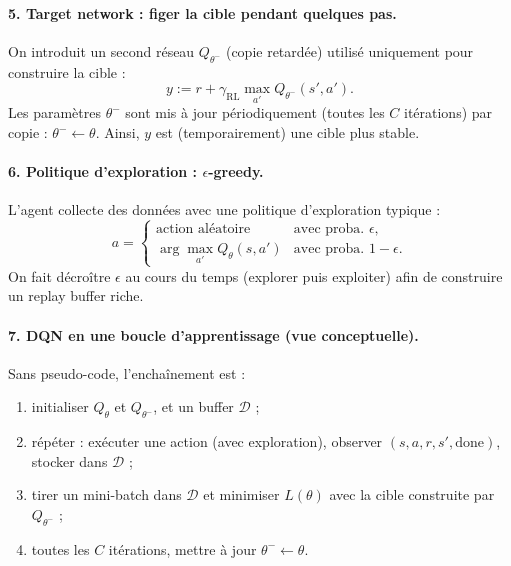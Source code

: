 \documentclass[11pt,a4paper]{article}
\newcommand{\1}{\mathbf{1}}
\begin{document}
\paragraph{5. Target network : figer la cible pendant quelques pas.}
On introduit un second r\'eseau $Q_{\theta^-}$ (copie retard\'ee) utilis\'e uniquement pour construire la cible :
\[
y := r + \gamma_{\mathrm{RL}} \max_{a'} Q_{\theta^-}(s',a').
\]
Les param\`etres $\theta^-$ sont mis \`a jour p\'eriodiquement (toutes les $C$ it\'erations) par
copie : $\theta^- \leftarrow \theta$. Ainsi, $y$ est (temporairement) une cible plus stable.

\paragraph{6. Politique d'exploration : $\epsilon$-greedy.}
L'agent collecte des donn\'ees avec une politique d'exploration typique :
\[
a =
\begin{cases}
\text{action al\'eatoire} & \text{avec proba. }\epsilon,\\
\arg\max_{a'} Q_\theta(s,a') & \text{avec proba. }1-\epsilon.
\end{cases}
\]
On fait d\'ecro\^{i}tre $\epsilon$ au cours du temps (explorer puis exploiter) afin de construire un replay buffer riche.

\paragraph{7. DQN en une boucle d'apprentissage (vue conceptuelle).}
Sans pseudo-code, l'encha\^{i}nement est :
\begin{enumerate}[leftmargin=*]
  \item initialiser $Q_\theta$ et $Q_{\theta^-}$, et un buffer $\mathcal{D}$ ;
  \item r\'ep\'eter : ex\'ecuter une action (avec exploration), observer $(s,a,r,s',\mathrm{done})$, stocker dans $\mathcal{D}$ ;
  \item tirer un mini-batch dans $\mathcal{D}$ et minimiser $L(\theta)$ avec la cible construite par $Q_{\theta^-}$ ;
  \item toutes les $C$ it\'erations, mettre \`a jour $\theta^-\leftarrow\theta$.
\end{enumerate}
\end{document}
